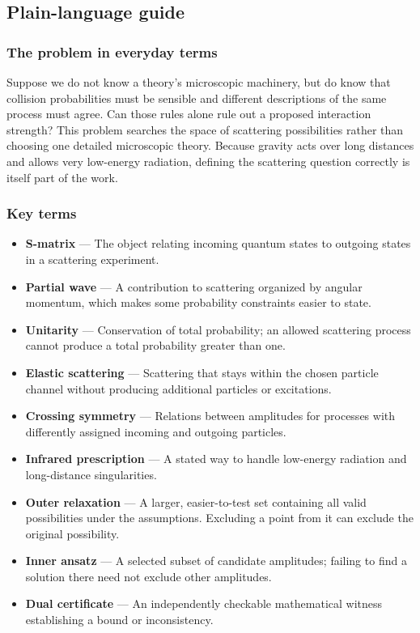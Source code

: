 \documentclass[
  11pt,
]{article}
\begin{document}
\subsection{Plain-language guide}

\subsubsection{The problem in everyday terms}

Suppose we do not know a theory's microscopic machinery, but do know
that collision probabilities must be sensible and different descriptions
of the same process must agree. Can those rules alone rule out a
proposed interaction strength? This problem searches the space of
scattering possibilities rather than choosing one detailed microscopic
theory. Because gravity acts over long distances and allows very
low-energy radiation, defining the scattering question correctly is
itself part of the work.

\subsubsection{Key terms}

\begin{itemize}
\item
  \textbf{S-matrix} --- The object relating incoming quantum states to
  outgoing states in a scattering experiment.
\item
  \textbf{Partial wave} --- A contribution to scattering organized by
  angular momentum, which makes some probability constraints easier to
  state.
\item
  \textbf{Unitarity} --- Conservation of total probability; an allowed
  scattering process cannot produce a total probability greater than
  one.
\item
  \textbf{Elastic scattering} --- Scattering that stays within the
  chosen particle channel without producing additional particles or
  excitations.
\item
  \textbf{Crossing symmetry} --- Relations between amplitudes for
  processes with differently assigned incoming and outgoing particles.
\item
  \textbf{Infrared prescription} --- A stated way to handle low-energy
  radiation and long-distance singularities.
\item
  \textbf{Outer relaxation} --- A larger, easier-to-test set containing
  all valid possibilities under the assumptions. Excluding a point from
  it can exclude the original possibility.
\item
  \textbf{Inner ansatz} --- A selected subset of candidate amplitudes;
  failing to find a solution there need not exclude other amplitudes.
\item
  \textbf{Dual certificate} --- An independently checkable mathematical
  witness establishing a bound or inconsistency.
\end{itemize}
\end{document}
